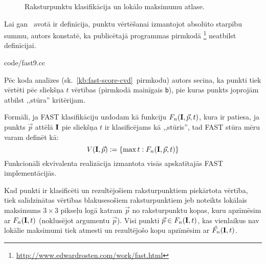 \begin{figure}[tbh]
	\centering
	\def\svgwidth{0.8\linewidth}
	{}
	\caption{Raksturpunktu klasifikācija un lokālo maksimumu atlase.}
	\label{fig:nonmax}
\end{figure}

Lai gan \cite{FAST}~avotā ir definīcija, punktu vērtēšanai izmantojot
absolūto starpību summu, autors konstatē, ka publicētajā programmas pirmkodā%
\footnote{\url{http://www.edwardrosten.com/work/fast.html}}
neatbilst definīcijai.

	
		{code/fast9.cc}

Pēc koda analīzes (sk.~\ref{kb:fast-score-cvd}~pirmkodu)
autors secina, ka punkti tiek vērtēti pēc sliekšņa $t$ vērtības
(pirmkodā mainīgais \texttt{b}), pie kuras
punkts joprojām atbilst ,,stūra'' kritērijam.

Formāli, ja FAST klasifikāciju uzdodam kā funkciju $F_n(\mathbf{I}, \vec{p}, t)$,
kura ir patiesa, ja punkts $\vec{p}$ attēlā $\mathbf{I}$
pie sliekšņa $t$ ir klasificējams
kā ,,stūris'', tad FAST stūra mēru varam definēt kā:
\begin{equation}\label{eq:fast-response}
	V(\mathbf{I}, \vec{p}) := \left\{ \max{t} : F_n(\mathbf{I}, \vec{p}, t) \right\}
\end{equation}
Funkcionāli ekvivalenta realizācija izmantota visās apskatītajās FAST
implementācijās.


Kad punkti ir klasificēti un rezultējošiem raksturpunktiem piekārtota
vērtība, tiek salīdzinātas vērtības blakusesošiem raksturpunktiem
jeb noteikts lokālais maksimums $3 \times 3$ pikseļu logā katram
$\vec{p}$ no raksturpunktu kopas, kuru apzīmēsim ar $F_n(\mathbf{I}, t)$
(noklusējot argumentu $\vec{p}$).
Visi punkti $\vec{p} \in F_n(\mathbf{I}, t)$, kas vienlaikus nav lokālie
maksimumi tiek atmesti un rezultējošo kopu apzīmēsim ar
$\hat{F_n}(\mathbf{I}, t)$.

